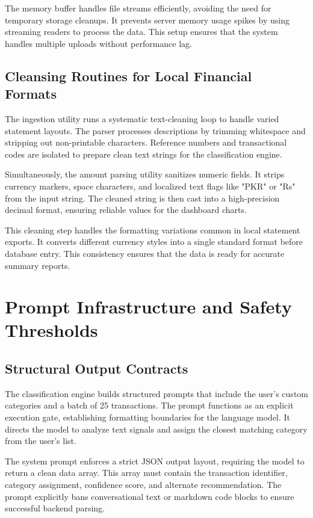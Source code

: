 The memory buffer handles file streams efficiently, avoiding the need for temporary storage cleanups. It prevents server memory usage spikes by using streaming readers to process the data. This setup ensures that the system handles multiple uploads without performance lag.

\subsection{Cleansing Routines for Local Financial Formats}
The ingestion utility runs a systematic text-cleaning loop to handle varied statement layouts. The parser processes descriptions by trimming whitespace and stripping out non-printable characters. Reference numbers and transactional codes are isolated to prepare clean text strings for the classification engine.

Simultaneously, the amount parsing utility sanitizes numeric fields. It strips currency markers, space characters, and localized text flags like "PKR" or "Rs" from the input string. The cleaned string is then cast into a high-precision decimal format, ensuring reliable values for the dashboard charts.

This cleaning step handles the formatting variations common in local statement exports. It converts different currency styles into a single standard format before database entry. This consistency ensures that the data is ready for accurate summary reports.

\section{Prompt Infrastructure and Safety Thresholds}

\subsection{Structural Output Contracts}
The classification engine builds structured prompts that include the user's custom categories and a batch of 25 transactions. The prompt functions as an explicit execution gate, establishing formatting boundaries for the language model. It directs the model to analyze text signals and assign the closest matching category from the user's list.

The system prompt enforces a strict JSON output layout, requiring the model to return a clean data array. This array must contain the transaction identifier, category assignment, confidence score, and alternate recommendation. The prompt explicitly bans conversational text or markdown code blocks to ensure successful backend parsing.

